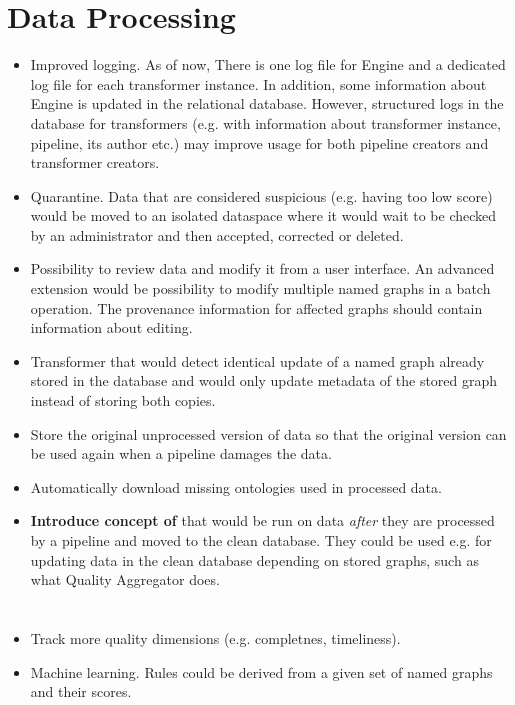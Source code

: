 \section{Data Processing}
\begin{itemize}
	\item Improved logging. As of now, There is one log file for Engine and a dedicated log file for each transformer instance. In addition, some information about Engine is updated in the relational database. However, structured logs in the database for transformers (e.g. with information about transformer instance, pipeline, its author etc.) may improve usage for both pipeline creators and transformer creators.
	\item Quarantine. Data that are considered suspicious (e.g. having too low \QA score) would be moved to an isolated dataspace where it would wait to be checked by an administrator and then accepted, corrected or deleted.
	\item Possibility to review data and modify it from a user interface. An advanced extension would be possibility to modify multiple named graphs in a batch operation. The provenance information for affected graphs should contain information about editing.
	\item Transformer that would detect identical update of a named graph already stored in the database and would only update metadata of the stored graph instead of storing both copies.
	\item Store the original unprocessed version of data so that the original version can be used again when a pipeline damages the data.
	\item Automatically download missing ontologies used in processed data.
	\item \textbf{Introduce concept of } that would be run on data \textit{after} they are processed by a pipeline and moved to the clean database. They could be used e.g. for updating data in the clean database depending on stored graphs, such as what Quality Aggregator does.
\end{itemize}

\section{\QA}
\begin{itemize}
	\item Track more quality dimensions (e.g. completnes, timeliness).
	\item Machine learning. Rules could be derived from a given set of named graphs and their scores.
\end{itemize}

